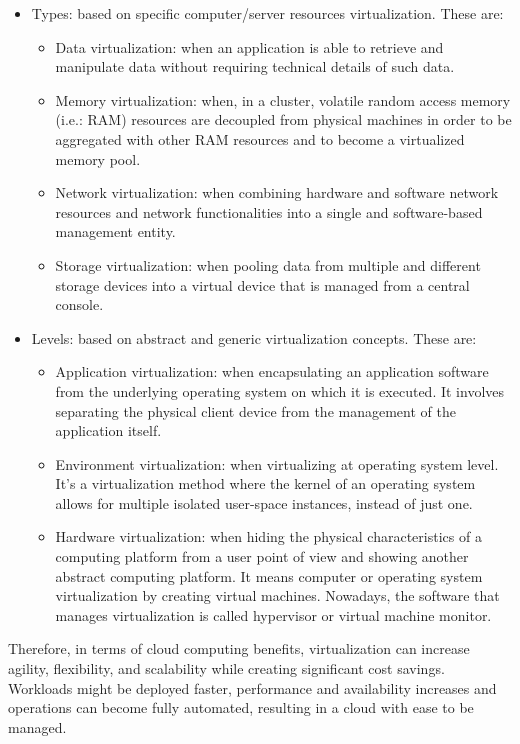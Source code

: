 \begin{itemize}
\item Types: based on specific computer/server resources virtualization. These are: 
\begin{itemize}
\item Data virtualization: when an application is able to retrieve and manipulate data without requiring technical details of such data.
\item Memory virtualization: when, in a cluster, volatile random access memory (i.e.: RAM) resources are decoupled from physical machines in order to be aggregated with other RAM resources and to become a virtualized memory pool.
\item Network virtualization: when combining hardware and software network resources and network functionalities into a single and software-based management entity.
\item Storage virtualization: when pooling data from multiple and different storage devices into a virtual device that is managed from a central console.
\end{itemize}
\item Levels: based on abstract and generic virtualization concepts. These are:
\begin{itemize}
\item Application virtualization: when encapsulating an application software from the underlying operating system on which it is executed. It involves separating the physical client device from the management of the application itself.
\item Environment virtualization: when virtualizing at operating system level. It's a virtualization method where the kernel of an operating system allows for multiple isolated user-space instances, instead of just one. 
\item Hardware virtualization: when hiding the physical characteristics of a computing platform from a user point of view and showing another abstract computing platform. It means computer or operating system virtualization by creating virtual machines.  Nowadays, the software that manages virtualization is called hypervisor or virtual machine monitor.
\end{itemize}
\end{itemize}

Therefore, in terms of cloud computing benefits, virtualization can increase agility, flexibility, and scalability while creating significant cost savings. Workloads might be deployed faster, performance and availability increases and operations can become fully automated, resulting in a cloud with ease to be managed. 


